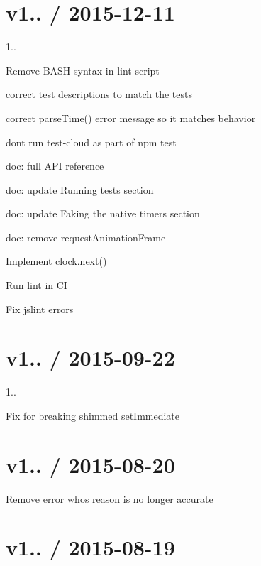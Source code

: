 \section*{v1.. / 2015-\/12-\/11 }


\begin{DoxyItemize}
\item 1..
\item Remove B\+A\+SH syntax in lint script
\item correct test descriptions to match the tests
\item correct parse\+Time() error message so it matches behavior
\item don\textquotesingle{}t run test-\/cloud as part of npm test
\item doc\+: full A\+PI reference
\item doc\+: update \textquotesingle{}Running tests\textquotesingle{} section
\item doc\+: update \textquotesingle{}Faking the native timers\textquotesingle{} section
\item doc\+: remove request\+Animation\+Frame
\item Implement clock.\+next()
\item Run lint in CI
\item Fix jslint errors
\end{DoxyItemize}

\section*{v1.. / 2015-\/09-\/22 }


\begin{DoxyItemize}
\item 1..
\item Fix for breaking shimmed set\+Immediate
\end{DoxyItemize}

\section*{v1.. / 2015-\/08-\/20 }


\begin{DoxyItemize}
\item Remove error whos reason is no longer accurate
\end{DoxyItemize}

\section*{v1.. / 2015-\/08-\/19 }



